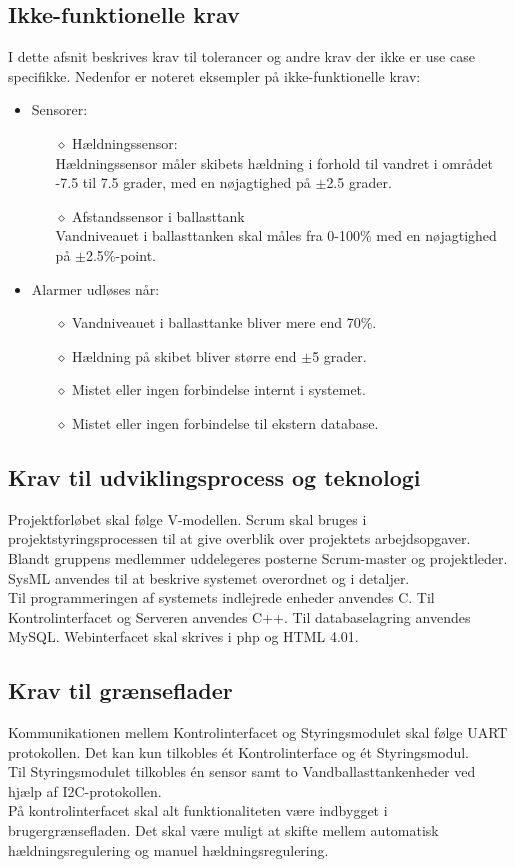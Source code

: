 \subsection{Ikke-funktionelle krav}
I dette afsnit beskrives krav til tolerancer og andre krav der ikke er use case specifikke. Nedenfor er noteret eksempler på ikke-funktionelle krav:
\begin{itemize}
\item Sensorer:
\begin{itemize}
\item[$\diamond$] Hældningssensor:\\
Hældningssensor måler skibets hældning i forhold til vandret i området -7.5 til 7.5 grader, med en nøjagtighed på $\pm$2.5 grader.\\
\item[$\diamond$] Afstandssensor i ballasttank\\
Vandniveauet i ballasttanken skal måles fra 0-100\% med en nøjagtighed på $\pm$2.5\%-point.
\end{itemize}
\item Alarmer udløses når:
\begin{itemize}
\item[$\diamond$]Vandniveauet i ballasttanke bliver mere end 70\%.
\item[$\diamond$]Hældning på skibet bliver større end $\pm$5 grader.
\item[$\diamond$]Mistet eller ingen forbindelse internt i systemet.
\item[$\diamond$]Mistet eller ingen forbindelse til ekstern database.
\end{itemize}
\end{itemize}
\subsection{Krav til udviklingsprocess og teknologi}
Projektforløbet skal følge V-modellen. Scrum skal bruges i projektstyringsprocessen til at give overblik over projektets arbejdsopgaver. Blandt gruppens medlemmer uddelegeres posterne Scrum-master og projektleder.\\
SysML anvendes til at beskrive systemet overordnet og i detaljer.\\
Til programmeringen af systemets indlejrede enheder anvendes C. Til Kontrolinterfacet og Serveren anvendes C++. Til databaselagring anvendes MySQL. Webinterfacet skal skrives i php og HTML 4.01.

\subsection{Krav til grænseflader}
Kommunikationen mellem Kontrolinterfacet og Styringsmodulet skal følge UART protokollen. Det kan kun tilkobles ét Kontrolinterface og ét Styringsmodul.\\
Til Styringsmodulet tilkobles én sensor samt to Vandballasttankenheder ved hjælp af I2C-protokollen.\\
På kontrolinterfacet skal alt funktionaliteten være indbygget i brugergrænsefladen. Det skal være muligt at skifte mellem automatisk hældningsregulering og manuel hældningsregulering.\\

